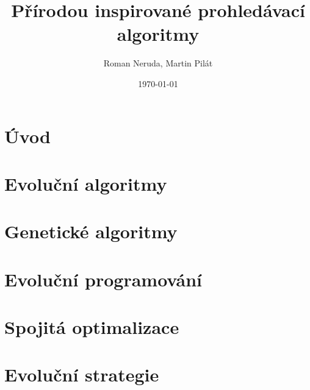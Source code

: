 \documentclass[a4paper,nofonts,nohyper,justified,colorinlistoftodos,hidelinks]{tufte-book}
\title{Přírodou inspirované prohledávací algoritmy}
\author{Roman Neruda, Martin Pilát}
\date{\today}
\begin{document}
\maketitle

\mainmatter

%
%

\chapter{Úvod}


\chapter{Evoluční algoritmy}


\chapter{Genetické algoritmy}


\chapter{Evoluční programování}


\chapter{Spojitá optimalizace}


\chapter{Evoluční strategie}

\end{document}
